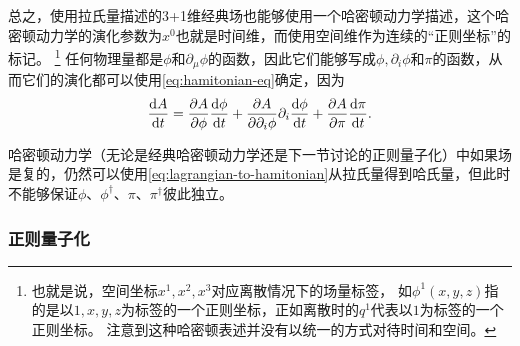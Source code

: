 \documentclass[hyperref, UTF8, a4paper]{ctexart}
\begin{document}
总之，使用拉氏量描述的3+1维经典场也能够使用一个哈密顿动力学描述，这个哈密顿动力学的演化参数为$x^0$也就是时间维，而使用空间维作为连续的“正则坐标”的标记。%
\footnote{也就是说，空间坐标$x^1, x^2, x^3$对应离散情况下的场量标签，
如$\phi^1(x, y, z)$指的是以$1, x, y, z$为标签的一个正则坐标，正如离散时的$q^{1}$代表以$1$为标签的一个正则坐标。
注意到这种哈密顿表述并没有以统一的方式对待时间和空间。\label{note:spacial-label}}%
任何物理量都是$\phi$和$\partial_\mu \phi$的函数，因此它们能够写成$\phi, \partial_i \phi$和$\pi$的函数，从而它们的演化都可以使用\eqref{eq:hamitonian-eq}确定，因为
\begin{equation}
    \dv{A}{t} = \pdv{A}{\phi} \dv{\phi}{t} + \pdv{A}{\partial_i \phi} \partial_i \dv{\phi}{t} + \pdv{A}{\pi} \dv{\pi}{t}.
    \label{eq:evolution-of-any-quantity}
\end{equation}

哈密顿动力学（无论是经典哈密顿动力学还是下一节讨论的正则量子化）中如果场是复的，仍然可以使用\eqref{eq:lagrangian-to-hamitonian}从拉氏量得到哈氏量，但此时不能够保证$\phi$、$\phi^\dagger$、$\pi$、$\pi^\dagger$彼此独立。

\subsubsection{正则量子化}\label{sec:canonical-quantization}
\end{document}
